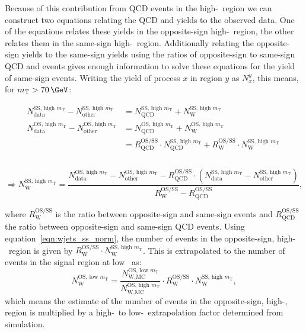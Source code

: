 Because of this contribution from QCD events in the high-\mT~region we
can construct two equations relating the QCD and \Wjets yields to the observed
data. One of the equations relates these yields in the opposite-sign high-\mT~region,
the other relates them in the same-sign high-\mT~region. Additionally 
relating the opposite-sign yields to the same-sign yields using the
ratios of opposite-sign to same-sign QCD and \Wjets events gives enough
information to solve these equations for the yield of same-sign \Wjets events.
Writing the yield of process $x$ in region $y$ as $N_x^y$, this means, for $\mTm>70\,\GeV$:\\
\begin{minipage}{\textwidth}
\begin{equation*}
\begin{split}
N_{\text{data}}^{\text{SS, high } m_{\text{T}}} - N_{\text{other}}^{\text{SS,
 high } m_{\text{T}}} &=
N_{\text{QCD}}^{\text{SS, high } m_{\text{T}}} + N_{\text{W}}^{\text{SS, high } m_{\text{T}}}\\
N_{\text{data}}^{\text{OS, high } m_{\text{T}}} - N_{\text{other}}^{\text{OS,
 high } m_{\text{T}}}  &= N_{\text{QCD}}^{\text{OS, high } m_{\text{T}}} +
N_{\text{W}}^{\text{OS, high } m_{\text{T}}}\\
&= R_{\text{QCD}}^{\text{OS/SS}}\cdot N_{\text{QCD}}^{\text{SS, high } m_{\text{T}}} +
R_{\text{W}}^{\text{OS/SS}} \cdot N_{\text{W}}^{\text{SS, high } m_{\text{T}}} ~\\
\end{split}
\end{equation*}
~\vspace{-\baselineskip}
\begin{equation}\label{eqn:wjets_ss_norm}
\Rightarrow N_{\text{W}}^{\text{SS, high } m_{\text{T}}} = \frac{N_{\text{data}}^{\text{OS,
 high } m_{\text{T}}}  - N_{\text{other}}^{\text{OS, high } m_{\text{T}}}  -
R_{\text{QCD}}^{\text{OS/SS}}\cdot(N_{\text{data}}^{\text{SS, high } m_{\text{T}}}  -
N_{\text{other}}^{\text{SS, high } m_{\text{T}}} )}{R_{\text{W}}^{\text{OS/SS}} -
R_{\text{QCD}}^{\text{OS/SS}}},
\end{equation}
\end{minipage}

where $R_{\text{W}}^{\text{OS/SS}}$ is the ratio between opposite-sign and same-sign \Wjets events
and $R_{\text{QCD}}^{\text{OS/SS}}$ the ratio between opposite-sign and same-sign QCD events. Using 
equation~\ref{eqn:wjets_ss_norm}, the number of \Wjets events in the
opposite-sign, high-\mT~region is given by $R_{\text{W}}^{\text{OS/SS}}\cdot N_{\text{W}}^{\text{SS, high } m_{\text{T}}}$. 
This is extrapolated to the number of \Wjets events in the signal region at low \mT~as:
\begin{equation}\label{eqn:wjets_os_norm}
N_{\text{W}}^{\text{OS, low } m_{\text{T}}} = \frac{N_{\text{W,MC}}^{\text{OS, low } m_{\text{T}}}}{N_{\text{W,MC}}^{\text{OS, high } m_{\text{T}}}}\cdot R_{\text{W}}^{\text{OS/SS}} \cdot N_{\text{W}}^{\text{SS, high }m_{\text{T}}},
\end{equation}
which means the estimate of the number of \Wjets events in the opposite-sign, high-\mT, region
is multiplied by a high-\mT~to low-\mT~extrapolation factor determined from simulation.

